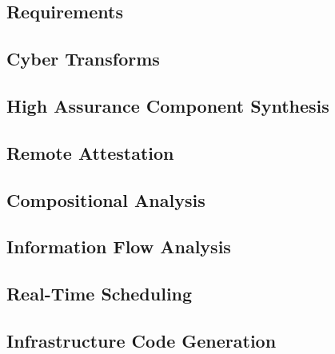 \documentclass{IEEEcsmag}
\begin{document}
\subsection{Requirements}


\subsection{Cyber Transforms}


\subsection{High Assurance Component Synthesis}


\subsection{Remote Attestation}


\subsection{Compositional Analysis}


\subsection{Information Flow Analysis}
\label{subsec:info-flow}


\subsection{Real-Time Scheduling}


\subsection{Infrastructure Code Generation}
\label{subsec:hamr}


\end{document}
